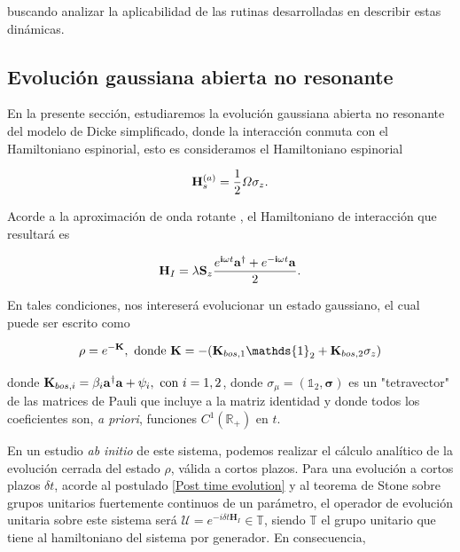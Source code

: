 \documentclass{report} %
\numberwithin{equation}{section}
\begin{document}
buscando analizar la aplicabilidad de las rutinas desarrolladas en describir estas dinámicas. 

\subsection{Evolución gaussiana abierta no resonante}
\label{dicke_gaussian}

En la presente sección, estudiaremos la evolución gaussiana abierta no resonante del modelo de Dicke simplificado, donde la interacción conmuta con el Hamiltoniano espinorial, esto es consideramos el Hamiltoniano espinorial 

$$
{\bf H}_s^{(a)} = \frac{1}{2} \Omega \sigma_z.
$$

Acorde a la aproximación de onda rotante \cite{Nielsen.00}, el Hamiltoniano de interacción que resultará es

\begin{equation}
    \mathbf{H}_I = \lambda {\bf S}_z\frac{e^{{\bf i}\omega t}{\bf a}^{\dagger}+e^{-{\bf i}\omega t}{\bf a}}{2}.
    \label{model3.5_interaction}
\end{equation}

En tales condiciones, nos intereserá evolucionar un estado gaussiano, el cual puede ser escrito como

\begin{equation}
    \rho = e^{-\mathbf{K}}, \textnormal{ donde } \mathbf{K} = -(\mathbf{K}_{bos,1} \mathds{1}_2 + \mathbf{K}_{bos,2}\sigma_z) 
    \label{model3.5_rho}
\end{equation}

donde $\mathbf{K}_{bos,i}= \beta_{i}{\bf a}^{\dagger}{\bf a} + \psi_i,  \textnormal{ con } i =1,2$, donde $\sigma_{\mu}=(\mathds{1}_2, \boldsymbol{\sigma})$ es un "tetravector"  de las matrices de Pauli que incluye a la matriz identidad y donde todos los coeficientes son, \textit{a priori}, funciones $C^{1}(\mathds{R}_{+})$ en $t$. 

En un estudio \textit{ab initio} de este sistema, podemos realizar el cálculo analítico de la evolución cerrada del estado $\rho$, válida a cortos plazos. Para una evolución a cortos plazos $\delta t$, acorde al postulado \ref{Post time evolution} y al teorema de Stone sobre grupos unitarios fuertemente continuos de un parámetro, el operador de evolución unitaria sobre este sistema será $\mathcal{U} = e^{-i\delta t \mathbf{H}_I} \in \mathds{T}$, siendo $\mathds{T}$ el grupo unitario que tiene al hamiltoniano del sistema por generador. En consecuencia, 
\end{document}

